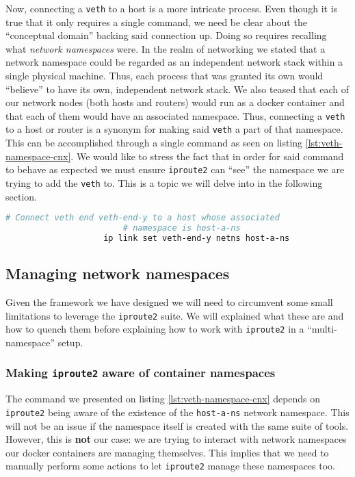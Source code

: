                 Now, connecting a \texttt{veth} to a host is a more intricate process. Even though it is true that it only requires a single command, we need be clear about the ``conceptual domain'' backing said connection up. Doing so requires recalling what \textit{network namespaces} were. In the realm of networking we stated that a network namespace could be regarded as an independent network stack within a single physical machine. Thus, each process that was granted its own would ``believe'' to have its own, independent network stack. We also teased that each of our network nodes (both hosts and routers) would run as a docker container and that each of them would have an associated namespace. Thus, connecting a \texttt{veth} to a host or router is a synonym for making said \texttt{veth} a part of that namespace. This can be accomplished through a single command as seen on listing \ref{lst:veth-namespace-cnx}. We would like to stress the fact that in order for said command to behave as expected we must ensure \texttt{iproute2} can ``see'' the namespace we are trying to add the \texttt{veth} to. This is a topic we will delve into in the following section.

                \begin{lstlisting}[language = bash, caption = Connecting a \texttt{veth} end to a host or router., label = lst:veth-namespace-cnx]
                    # Connect veth end veth-end-y to a host whose associated
                        # namespace is host-a-ns
                    ip link set veth-end-y netns host-a-ns
                \end{lstlisting}

        \subsection{Managing network namespaces}
            Given the framework we have designed we will need to circumvent some small limitations to leverage the \texttt{iproute2} suite. We will explained what these are and how to quench them before explaining how to work with \texttt{iproute2} in a ``multi-namespace'' setup.
            \subsubsection{Making \texttt{iproute2} aware of container namespaces}
                The command we presented on listing \ref{lst:veth-namespace-cnx} depends on \texttt{iproute2} being aware of the existence of the \texttt{host-a-ns} network namespace. This will not be an issue if the namespace itself is created with the same suite of tools. However, this is \textbf{not} our case: we are trying to interact with network namespaces our docker containers are managing themselves. This implies that we need to manually perform some actions to let \texttt{iproute2} manage these namespaces too.

